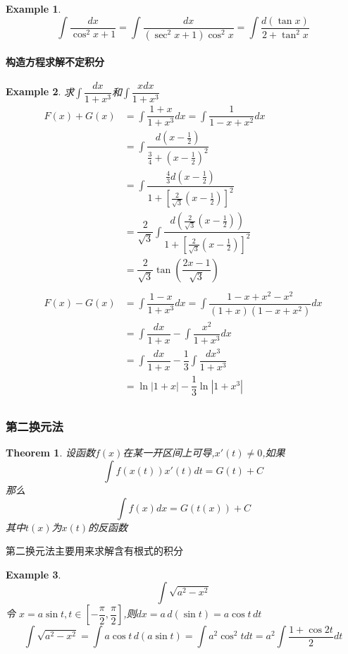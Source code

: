 \documentclass[11pt,hyperref,a4paper,UTF8]{ctexart}
\newtheorem{theorem}{Theorem}[subsection]
\newtheorem{example}{Example}[subsection]
\begin{document}
\begin{CJK}{UTF8}{gkai}
\begin{example}
  \[\int \dfrac{dx}{\cos^2 x+ 1} = \int \dfrac{dx}{(\sec^2 x+ 1)\cos^2 x} = \int \dfrac{d(\tan x)}{2 + \tan^2 x}\]
\end{example}

\paragraph{构造方程求解不定积分}

\begin{example}
  求$\int \dfrac{dx}{1 + x^3}$和$\int \dfrac{xdx}{1 + x^3}$\\
  \[
  \begin{aligned}  
  F(x) + G(x) &= \int \dfrac{1 + x}{1 + x^3}dx = \int \dfrac{1}{1-x + x^2}dx\\
  &=\int \dfrac{d(x-\frac{1}{2})}{\frac{3}{4}+(x-\frac{1}{2})^2}\\
  &=\int \dfrac{\frac{4}{3}d(x-\frac{1}{2})}{1+[\frac{2}{\sqrt{3}}(x-\frac{1}{2})]^2}\\
  &=\dfrac{2}{\sqrt{3}}\int \dfrac{d(\frac{2}{\sqrt{3}}(x-\frac{1}{2}))}{1+[\frac{2}{\sqrt{3}}(x-\frac{1}{2})]^2}\\
  &=\dfrac{2}{\sqrt{3}}\tan\left(\dfrac{2x - 1}{\sqrt{3}}\right)\\
  &\\
F(x) - G(x) &= \int \dfrac{1 - x}{1 + x^3}dx = \int \dfrac{1-x + x^2 - x^2}{(1+ x )(1 -x + x^2)}dx \\
&= \int \dfrac{dx}{1+x} - \int \dfrac{x^2}{1+x^3} dx  \\
&= \int \dfrac{dx}{1+x} - \dfrac{1}{3}\int \dfrac{dx^3}{1+x^3} \\
&=\ln|1 + x| - \dfrac{1}{3}\ln|1 + x^3|\\
  \end{aligned}
\]
\end{example}
\subsubsection{第二换元法}
\begin{theorem}
设函数$f(x)$在某一开区间上可导,$x'(t) \neq 0$,如果
\[\int f(x(t))x'(t)dt = G(t) + C\]
那么
\[\int f(x)dx = G(t(x)) + C\]
其中$t(x)$为$x(t)$的反函数\\
\end{theorem}

第二换元法主要用来求解含有根式的积分\\
\begin{example}
\[\int \sqrt{a^2 - x^2}\]
令 $x = a\sin t, t\in [-\dfrac{\pi}{2},\dfrac{\pi}{2}]$,则$dx = a \,d(\sin t)= a\cos t \, dt$
\[\int \sqrt{a^2 - x^2} = \int a\cos t \,d( a\sin t) = \int a^2 \cos^2 t dt = a^2 \int \dfrac{1 + \cos 2t}{2} dt\]
\end{example}


\end{CJK}
\end{document}
